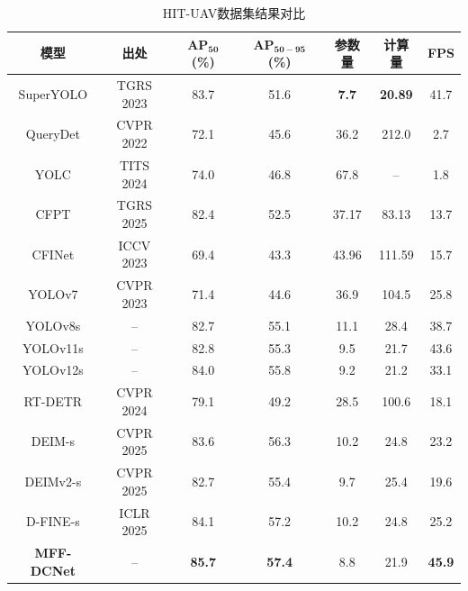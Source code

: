 \begin{table}[!ht]
  \centering
  \caption{HIT-UAV数据集结果对比}
  \begin{tabular*}{\textwidth}{@{\extracolsep{\fill}}ccccccc}
    \toprule
    模型 & 出处 &  $\mathbf{AP_{50}}$ (\%) & $\mathbf{AP_{50-95}}$ (\%) & 参数量 & 计算量 & FPS \\
    \midrule
    SuperYOLO \cite{Zhang2023SuperYOLO} & TGRS 2023 & 83.7 & 51.6 & \textbf{7.7} & \textbf{20.89} & 41.7 \\
    QueryDet \cite{Yang2022QueryDet} & CVPR 2022 & 72.1 & 45.6 & 36.2 & 212.0 & 2.7 \\
    YOLC \cite{Liu2024YOLC} & TITS 2024 & 74.0 & 46.8 & 67.8 & -- & 1.8 \\
    CFPT \cite{Du2025CFTP} & TGRS 2025 & 82.4 & 52.5 & 37.17 & 83.13 & 13.7 \\
    CFINet \cite{Yuan2023CFINet} & ICCV 2023 & 69.4 & 43.3 & 43.96 & 111.59 & 15.7 \\
    YOLOv7 & CVPR 2023 & 71.4 & 44.6 & 36.9 & 104.5 & 25.8 \\
    YOLOv8s & -- & 82.7 & 55.1 & 11.1 & 28.4 & 38.7 \\
    YOLOv11s & -- & 82.8 & 55.3 & 9.5 & 21.7 & 43.6 \\
    YOLOv12s & -- & 84.0 & 55.8& 9.2 & 21.2 & 33.1 \\
    RT-DETR \cite{Zhao202RTDETR} & CVPR 2024 & 79.1 & 49.2 & 28.5 & 100.6 & 18.1 \\
    DEIM-s \cite{Huang2025DEIM} & CVPR 2025 & 83.6 & 56.3 & 10.2 & 24.8 & 23.2 \\
    DEIMv2-s \cite{Huang2025DEIMv2} & CVPR 2025 & 82.7 & 55.4 & 9.7 & 25.4 & 19.6 \\
    D-FINE-s \cite{Yansong2025D-FINE} & ICLR 2025 & 84.1 & 57.2 & 10.2 & 24.8 & 25.2 \\
    \midrule
    \textbf{MFF-DCNet} & -- & \textbf{85.7} & \textbf{57.4} & 8.8 & 21.9 & \textbf{45.9} \\
    \bottomrule
  \end{tabular*}
  \label{t2}
\end{table}


